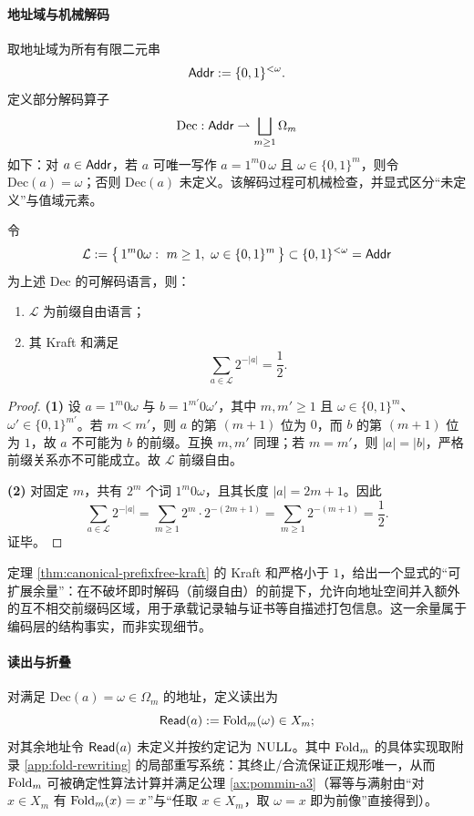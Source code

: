 \paragraph{地址域与机械解码}
取地址域为所有有限二元串
$$
\mathsf{Addr}:=\{0,1\}^{<\omega}.
$$
定义部分解码算子
$$
\mathrm{Dec}:\mathsf{Addr}\rightharpoonup \bigsqcup_{m\ge 1}\Omega_m
$$
如下：对 $a\in\mathsf{Addr}$，若 $a$ 可唯一写作 $a=1^m 0\,\omega$ 且 $\omega\in\{0,1\}^m$，则令 $\mathrm{Dec}(a)=\omega$；否则 $\mathrm{Dec}(a)$ 未定义。该解码过程可机械检查，并显式区分“未定义”与值域元素。\par

\begin{theorem}\label{thm:canonical-prefixfree-kraft}
令
$$
\mathcal{L}:=\bigl\{\,1^m0\omega:\ m\ge 1,\ \omega\in\{0,1\}^m\,\bigr\}\subset \{0,1\}^{<\omega}=\Addr
$$
为上述 $\mathrm{Dec}$ 的可解码语言，则：
\begin{enumerate}
  \item $\mathcal{L}$ 为前缀自由语言；
  \item 其 Kraft 和满足
  $$
  \sum_{a\in\mathcal{L}}2^{-|a|}=\frac12.
  $$
\end{enumerate}
\end{theorem}

\begin{proof}
\textbf{(1)} 设 $a=1^{m}0\omega$ 与 $b=1^{m'}0\omega'$，其中 $m,m'\ge 1$ 且 $\omega\in\{0,1\}^{m}$、$\omega'\in\{0,1\}^{m'}$。若 $m<m'$，则 $a$ 的第 $(m+1)$ 位为 $0$，而 $b$ 的第 $(m+1)$ 位为 $1$，故 $a$ 不可能为 $b$ 的前缀。互换 $m,m'$ 同理；若 $m=m'$，则 $|a|=|b|$，严格前缀关系亦不可能成立。故 $\mathcal{L}$ 前缀自由。\par
\textbf{(2)} 对固定 $m$，共有 $2^{m}$ 个词 $1^{m}0\omega$，且其长度 $|a|=2m+1$。因此
$$
\sum_{a\in\mathcal{L}}2^{-|a|}
=\sum_{m\ge 1}2^{m}\cdot 2^{-(2m+1)}
=\sum_{m\ge 1}2^{-(m+1)}
=\frac12.
$$
证毕。
\end{proof}

\begin{remark}
定理 \ref{thm:canonical-prefixfree-kraft} 的 Kraft 和严格小于 $1$，给出一个显式的“可扩展余量”：在不破坏即时解码（前缀自由）的前提下，允许向地址空间并入额外的互不相交前缀码区域，用于承载记录轴与证书等自描述打包信息。这一余量属于编码层的结构事实，而非实现细节。
\end{remark}

\paragraph{读出与折叠}
对满足 $\mathrm{Dec}(a)=\omega\in\Omega_m$ 的地址，定义读出为
$$
\mathsf{Read}(a):=\mathrm{Fold}_m(\omega)\in X_m;
$$
对其余地址令 $\mathsf{Read}(a)$ 未定义并按约定记为 $\mathrm{NULL}$。其中 $\mathrm{Fold}_m$ 的具体实现取附录 \ref{app:fold-rewriting} 的局部重写系统：其终止/合流保证正规形唯一，从而 $\mathrm{Fold}_m$ 可被确定性算法计算并满足公理 \ref{ax:pommin-a3}（幂等与满射由“对 $x\in X_m$ 有 $\mathrm{Fold}_m(x)=x$”与“任取 $x\in X_m$，取 $\omega=x$ 即为前像”直接得到）。\par

